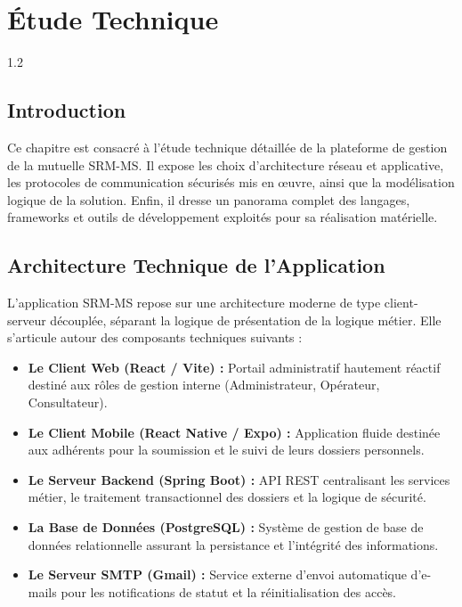 \chapter{Étude Technique}
\begin{spacing}{1.2}
\minitoc
\thispagestyle{MyStyle}
\end{spacing}
\newpage

\section{Introduction}
Ce chapitre est consacré à l'étude technique détaillée de la plateforme de gestion de la mutuelle SRM-MS. Il expose les choix d'architecture réseau et applicative, les protocoles de communication sécurisés mis en œuvre, ainsi que la modélisation logique de la solution. Enfin, il dresse un panorama complet des langages, frameworks et outils de développement exploités pour sa réalisation matérielle.

\section{Architecture Technique de l'Application}
\label{sec:architecture_technique_application}

L'application SRM-MS repose sur une architecture moderne de type client-serveur découplée, séparant la logique de présentation de la logique métier. Elle s'articule autour des composants techniques suivants :
\begin{itemize}
    \item \textbf{Le Client Web (React / Vite) :} Portail administratif hautement réactif destiné aux rôles de gestion interne (Administrateur, Opérateur, Consultateur).
    \item \textbf{Le Client Mobile (React Native / Expo) :} Application fluide destinée aux adhérents pour la soumission et le suivi de leurs dossiers personnels.
    \item \textbf{Le Serveur Backend (Spring Boot) :} API REST centralisant les services métier, le traitement transactionnel des dossiers et la logique de sécurité.
    \item \textbf{La Base de Données (PostgreSQL) :} Système de gestion de base de données relationnelle assurant la persistance et l'intégrité des informations.
    \item \textbf{Le Serveur SMTP (Gmail) :} Service externe d'envoi automatique d'e-mails pour les notifications de statut et la réinitialisation des accès.
\end{itemize}

